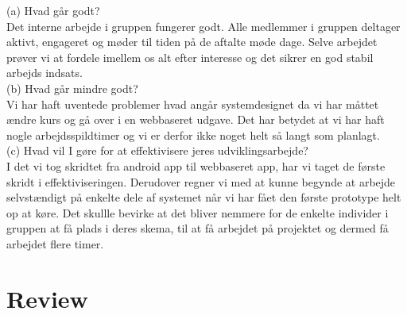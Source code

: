 \documentclass[12pt]{article}
\begin{document}
(a) Hvad går godt?\\
Det interne arbejde i gruppen fungerer godt. Alle medlemmer i gruppen deltager aktivt, engageret og møder til tiden på de aftalte møde dage. Selve arbejdet prøver vi at fordele imellem os alt efter interesse og det sikrer en god stabil arbejds indsats.\\

(b) Hvad går mindre godt?\\

Vi har haft uventede problemer hvad angår systemdesignet da vi har måttet ændre kurs og gå over i en webbaseret udgave. Det har betydet at vi har haft nogle arbejdsspildtimer og vi er derfor ikke noget helt så langt som planlagt.\\

(c) Hvad vil I gøre for at effektivisere jeres udviklingsarbejde?\\

I det vi tog skridtet fra android app til webbaseret app, har vi taget de første skridt i effektiviseringen. Derudover regner vi med at kunne begynde at arbejde selvstændigt på enkelte dele af systemet når vi har fået den første prototype helt op at køre. Det skullle bevirke at det bliver nemmere for de enkelte individer i gruppen at få plads i deres skema, til at få arbejdet på projektet og dermed få arbejdet flere timer. 

\pagebreak
\section{Review}
\end{document}
